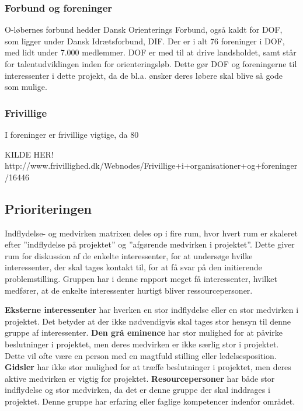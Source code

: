 \subsubsection{Forbund og foreninger}
O-løbernes forbund hedder Dansk Orienterings Forbund, også kaldt for DOF, som ligger under Dansk Idrætsforbund, DIF. Der er i alt 76 foreninger i DOF, med lidt under 7.000 medlemmer\citep{DIF}. DOF er med til at drive landsholdet, samt står for talentudviklingen inden for orienteringsløb. Dette gør DOF og foreningerne til interessenter i dette projekt, da de bl.a. ønsker deres løbere skal blive så gode som mulige. \citep{DIF}

\subsubsection{Frivillige}
I foreninger er frivillige vigtige, da 80%

KILDE HER! http://www.frivillighed.dk/Webnodes/Frivillige+i+organisationer+og+foreninger/16446 


\subsection{Prioriteringen}
Indflydelse- og medvirken matrixen deles op i fire rum, hvor hvert rum er skaleret efter ”indflydelse på projektet” og ”afgørende medvirken i projektet”. Dette giver rum for diskussion af de enkelte interessenter, for at undersøge hvilke interessenter, der skal tages kontakt til, for at få svar på den initierende problemstilling.
Gruppen har i denne rapport meget få interessenter, hvilket medfører, at de enkelte interessenter hurtigt bliver ressourcepersoner.

\textbf{Eksterne interessenter} har hverken en stor indflydelse eller en stor medvirken i projektet. Det betyder at der ikke nødvendigvis skal tages stor hensyn til denne gruppe af interessenter.\newline 
\textbf{Den grå eminence} har stor mulighed for at påvirke beslutninger i projektet, men deres medvirken er ikke særlig stor i projektet. Dette vil ofte være en person med en magtfuld stilling eller ledelsesposition. \newline
\textbf{Gidsler} har ikke stor mulighed for at træffe beslutninger i projektet, men deres aktive medvirken er vigtig for projektet.\newline
\textbf{Resourcepersoner} har både stor indflydelse og stor medvirken, da det er denne gruppe der skal inddrages i projektet. Denne gruppe har erfaring eller faglige kompetencer indenfor området. \newline

